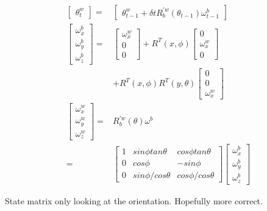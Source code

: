 \documentclass[conference]{IEEEtran}
\begin{document}
\begin{align}
\begin{bmatrix} 
\theta_{t}^{w}\end{bmatrix} =& \begin{bmatrix} 
\theta_{t-1}^{w} + \delta t R_b^{\prime w}(\theta_{t-1}) \omega_{t-1}^b \end{bmatrix} \label{eq:state_transition_eq}\\
\begin{bmatrix} \omega_x^b\\ \omega_y^b\\ \omega_z^b \end{bmatrix} =& \begin{bmatrix} \omega_x^w\\ 0\\ 0\end{bmatrix} + R^T(x, \phi) \begin{bmatrix} 0\\ \omega_x^w\\ 0\end{bmatrix} \\
& + R^T(x, \phi) R^T(y, \theta) \begin{bmatrix} 0\\ 0\\ \omega_x^w \end{bmatrix} \\
\begin{bmatrix} \omega_x^w\\ \omega_y^w\\ \omega_z^w \end{bmatrix} =& R_b^{'w} (\theta) \omega^b\\
=& \begin{bmatrix} 1& sin\phi tan\theta& cos\phi tan\theta\\
			     0& cos \phi& -sin\phi\\
			    0& sin\phi / cos \theta& cos\phi/cos\theta \end{bmatrix} \begin{bmatrix} \omega_x^b\\ \omega_y^b\\ \omega_z^b \end{bmatrix}  \label{eq:angular_rates_world_eq}
\end{align}

State matrix only looking at the orientation. Hopefully more correct.
\end{document}

